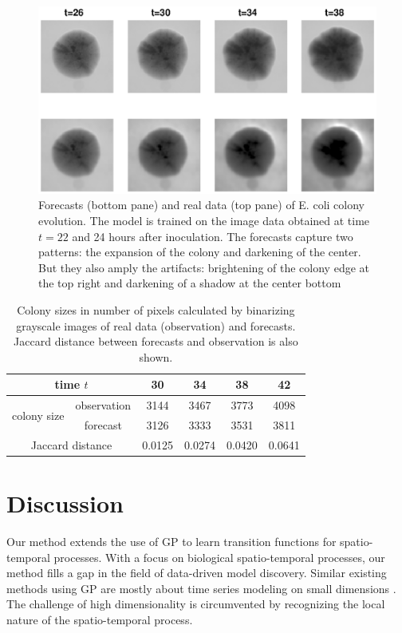 \documentclass[smallextended,natbib]{svjour3}       %
\begin{document}
\begin{figure}[h]
\centerline{\includegraphics[width=\textwidth]{chapterGP/figures/ecoli100by100}}
\caption[]{\label{fig:ecoli} Forecasts (bottom pane) and real data (top pane) of E. coli colony evolution. The model is trained on the image data obtained at time $t=22$ and 24 hours after inoculation. The forecasts capture two patterns: the expansion of the colony and darkening of the center. But they also amply the artifacts: brightening of the colony edge at the top right and darkening of a shadow at the center bottom}
\end{figure}

\begin{table}[h]
\begin{center}
\caption{Colony sizes in number of pixels calculated by binarizing grayscale images of real data (observation) and forecasts. Jaccard distance between forecasts and observation is also shown.}
\label{tab:colony-size-jd}
\begin{tabular}{cccccc} \hline
 \multicolumn{2}{c}{time $t$ } & 30 & 34 & 38 & 42\\ \hline\hline
\multirow{2}{5em}{colony size} & observation & 3144 & 3467 & 3773 & 4098 \\
& forecast & 3126 & 3333 & 3531 & 3811 \\ \hline
 \multicolumn{2}{c}{Jaccard distance} & 0.0125 & 0.0274 & 0.0420 & 0.0641 \\ \hline
\end{tabular}
\end{center}
\end{table}



\section{Discussion} \label{sec:GP-conclude}
Our method extends the use of GP to learn transition functions for spatio-temporal processes. With a focus on biological spatio-temporal processes, our method fills a gap in the field of data-driven model discovery. Similar existing methods using GP are mostly about time series modeling on small dimensions \citep{Roberts2013}. The challenge of high dimensionality is circumvented by recognizing the local nature of the spatio-temporal process.
\end{document}
